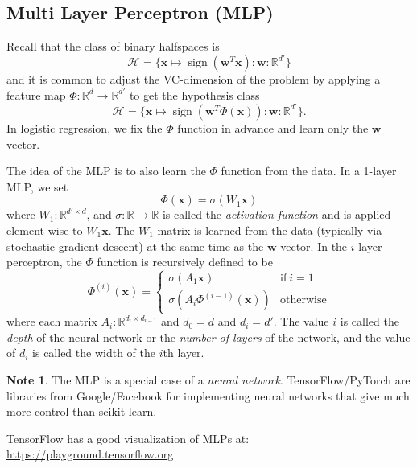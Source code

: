 \documentclass[10pt]{exam}
\theoremstyle{definition}
\newtheorem{problem}{Problem}
\newtheorem{note}{Note}
\newcommand{\R}{\mathbb R}
\DeclareMathOperator{\sign}{sign}
\newcommand{\trans}[1]{{#1}^{T}}
\newcommand{\w}{\mathbf w}
\newcommand{\x}{\mathbf x}
\newcommand{\HH}[1]{\mathcal H_{\text{#1}}}
\begin{document}

\newpage
\subsection{Multi Layer Perceptron (MLP)}

Recall that the class of binary halfspaces is
\begin{equation}
    \HH{} = \bigg\{ \x \mapsto \sign(\trans\w \x) : \w : \R^{d'} \bigg\}
\end{equation}
and it is common to adjust the VC-dimension of the problem by applying a feature map
$\Phi : \R^d \to \R^{d'}$ to get the hypothesis class
\begin{equation}
    \HH{} = \bigg\{ \x \mapsto \sign(\trans\w \Phi(\x)) : \w : \R^{d'} \bigg\}
    .
\end{equation}
In logistic regression, we fix the $\Phi$ function in advance and learn only the $\w$ vector.

The idea of the MLP is to also learn the $\Phi$ function from the data.
In a 1-layer MLP, we set
\begin{equation}
    \Phi(\x) = \sigma ( W_1 \x)
\end{equation}
where $W_1 : \R^{d'\times d}$,
and $\sigma : \R \to \R$ is called the \emph{activation function} and is applied element-wise to $W_1\x$.
The $W_1$ matrix is learned from the data (typically via stochastic gradient descent) at the same time as the $\w$ vector.
In the $i$-layer perceptron, the $\Phi$ function is recursively defined to be
\begin{equation}
    \Phi^{(i)}(\x) =
    \begin{cases}
        \sigma (A_1 \x) & \text{if}~i = 1 \\
        \sigma (A_i \Phi^{(i-1)}(\x)) & \text{otherwise}
    \end{cases}
\end{equation}
where each matrix $A_i : \R^{d_i \times d_{i-1}}$ and $d_0 = d$ and $d_i = d'$.
The value $i$ is called the \emph{depth} of the neural network or the \emph{number of layers} of the network, and the value of $d_i$ is called the width of the $i$th layer.


\vspace{4in}
\begin{note}
    The MLP is a special case of a \emph{neural network}.
    TensorFlow/PyTorch are libraries from Google/Facebook for implementing neural networks that give much more control than scikit-learn.

    TensorFlow has a good visualization of MLPs at:
    \url{https://playground.tensorflow.org}
\end{note}
\end{document}
